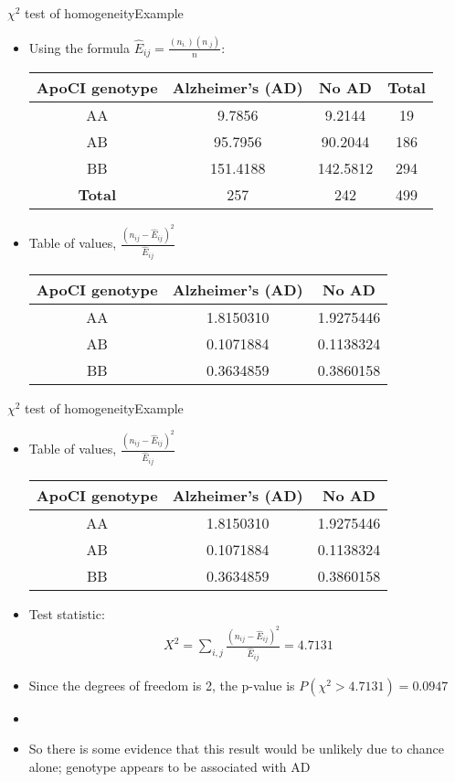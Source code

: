 \documentclass[xcolor=dvipsnames]{beamer}
\begin{document}
\begin{frame}{$\chi^2$ test of homogeneity}{Example}
	\begin{itemize}
		\item Using the formula $\hat{E}_{ij} = \frac{(n_{i.})(n_{.j})}{n}$:
		\begin{center}
			\begin{tabular}{c|cc|c}
				\hline
				\textbf{ApoCI genotype} & \textbf{Alzheimer's (AD)} & \textbf{No AD} & \textbf{Total}\\ \hline
				AA &   9.7856 &   9.2144 & 19\\
				AB &  95.7956&   90.2044 & 186\\
				BB & 151.4188 & 142.5812 & 294\\ \hline
				\textbf{Total} & 257 & 242 & 499
			\end{tabular}
		\end{center}
	\item Table of values, $\frac{(n_{ij}-\hat{E}_{ij})^2}{\hat{E}_{ij}}$
			\begin{center}
		\begin{tabular}{c|cc}
			\hline
			\textbf{ApoCI genotype} & \textbf{Alzheimer's (AD)} & \textbf{No AD}\\ \hline
			AA& 1.8150310& 1.9275446\\
			AB& 0.1071884& 0.1138324\\
			BB& 0.3634859& 0.3860158\\ \hline
		\end{tabular}
	\end{center}
	\end{itemize}
\end{frame}

\begin{frame}{$\chi^2$ test of homogeneity}{Example}
\begin{itemize}
	\item Table of values, $\frac{(n_{ij}-\hat{E}_{ij})^2}{\hat{E}_{ij}}$
	\begin{center}
		\begin{tabular}{c|cc}
			\hline
			\textbf{ApoCI genotype} & \textbf{Alzheimer's (AD)} & \textbf{No AD}\\ \hline
			AA& 1.8150310& 1.9275446\\
			AB& 0.1071884& 0.1138324\\
			BB& 0.3634859& 0.3860158\\ \hline
		\end{tabular}
	\end{center}
		\item Test statistic:
		\begin{gather*}
		X^2 = \sum_{i,j} \frac{(n_{ij}-\hat{E}_{ij})^2}{\hat{E}_{ij}} = 4.7131
		\end{gather*}
		\item Since the degrees of freedom is 2, the p-value is $P(\chi^2 > 4.7131)=0.0947$
		\item[]
		\item So there is some evidence that this result would be unlikely due to chance alone; genotype appears to be associated with AD
\end{itemize}
\end{frame}
\end{document}
